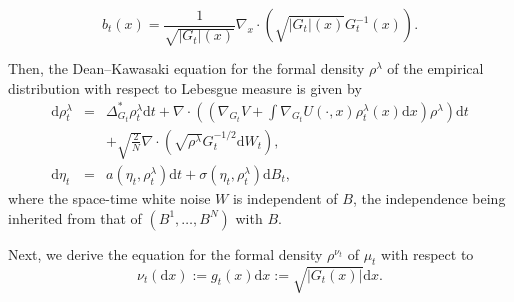 \documentclass[11pt, a4paper]{article}
\newcommand{\cdummy}{\cdot}
\newcommand{\mathd}{\mathrm{d}}
\begin{document}
\[
  b_t (x) = \frac{1}{\sqrt{| G_{t} | (x)}} \nabla_x \cdummy
  \left( \sqrt{| G_{t} | (x)} G^{- 1}_{t} (x) \right).
\] 

Then, the Dean--Kawasaki equation for the formal density $\rho^\lambda$ of the empirical distribution with respect to Lebesgue measure is given by 
\begin{eqnarray*}
  \mathd \rho^\lambda_t & = & \Delta_{G_{t}}^{\ast} \rho^\lambda_t \mathd t + \nabla \cdummy \left( \left( \nabla_{G_{t}} V +
  \int \nabla_{G_{t}} U (\cdummy, x) \rho^\lambda_t (x) \mathd x
  \right) \rho^\lambda \right) \mathd t\\
  &  & + \sqrt{\frac{2}{N}} \nabla \cdummy \left( \sqrt{\rho^\lambda}
  G_{t}^{- 1 / 2} \mathd W_t \right),\\
  \mathd \eta_t & = & a (\eta_t,\rho_t^\lambda) \mathd t + \sigma
  (\eta_t, \rho^\lambda_t) \mathd B_t,
\end{eqnarray*}
where the space-time white noise $W$ is independent of $B$, the independence being inherited from that of $(B^1,\dots,B^N)$ with $B$.


Next, we derive the equation for the formal density $\rho^{\nu_t}$ of $\mu_t$ with respect to
\begin{equation*}
    \nu_t (\mathd x)  := g_t(x)\mathd x:=\sqrt{| G_t (x) |} \mathd x. 
\end{equation*}
   
\end{document}
